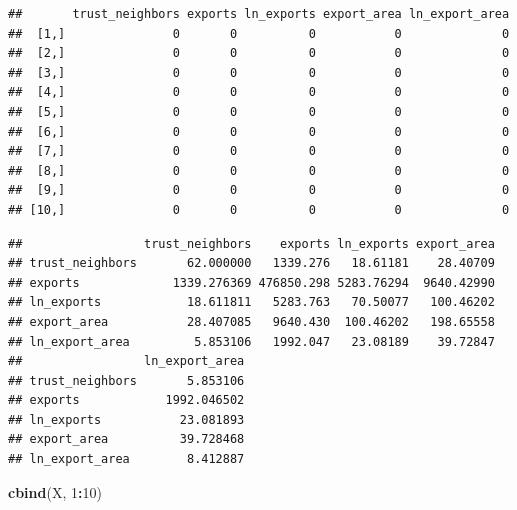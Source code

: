 \documentclass[
]{book}
\newenvironment{Shaded}{\begin{snugshade}}{\end{snugshade}}
\newcommand{\DecValTok}[1]{\textcolor[rgb]{0.00,0.00,0.81}{#1}}
\newcommand{\KeywordTok}[1]{\textcolor[rgb]{0.13,0.29,0.53}{\textbf{#1}}}
\newcommand{\NormalTok}[1]{#1}
\newcommand{\OperatorTok}[1]{\textcolor[rgb]{0.81,0.36,0.00}{\textbf{#1}}}
\newcommand{\StringTok}[1]{\textcolor[rgb]{0.31,0.60,0.02}{#1}}
\theoremstyle{definition}
\theoremstyle{definition}
\theoremstyle{definition}
\theoremstyle{definition}
\theoremstyle{remark}
\begin{document}
\begin{verbatim}
##       trust_neighbors exports ln_exports export_area ln_export_area
##  [1,]               0       0          0           0              0
##  [2,]               0       0          0           0              0
##  [3,]               0       0          0           0              0
##  [4,]               0       0          0           0              0
##  [5,]               0       0          0           0              0
##  [6,]               0       0          0           0              0
##  [7,]               0       0          0           0              0
##  [8,]               0       0          0           0              0
##  [9,]               0       0          0           0              0
## [10,]               0       0          0           0              0
\end{verbatim}

\begin{Shaded}
\end{Shaded}

\begin{verbatim}
##                 trust_neighbors    exports ln_exports export_area
## trust_neighbors       62.000000   1339.276   18.61181    28.40709
## exports             1339.276369 476850.298 5283.76294  9640.42990
## ln_exports            18.611811   5283.763   70.50077   100.46202
## export_area           28.407085   9640.430  100.46202   198.65558
## ln_export_area         5.853106   1992.047   23.08189    39.72847
##                 ln_export_area
## trust_neighbors       5.853106
## exports            1992.046502
## ln_exports           23.081893
## export_area          39.728468
## ln_export_area        8.412887
\end{verbatim}

\begin{Shaded}
\begin{Highlighting}[]
\KeywordTok{cbind}\NormalTok{(X, }\DecValTok{1}\OperatorTok{:}\DecValTok{10}\NormalTok{)}
\end{Highlighting}
\end{Shaded}
\end{document}
